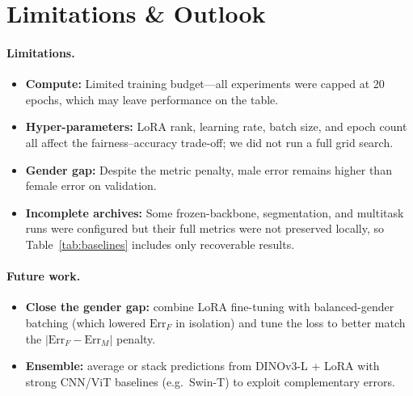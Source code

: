 \documentclass[10pt,a4paper]{article}
\begin{document}
\section*{Limitations \& Outlook}
\paragraph{Limitations.}
\begin{itemize}
  \item \textbf{Compute:} Limited training budget---all experiments were capped at 20 epochs, which may leave performance on the table.
  \item \textbf{Hyper-parameters:} LoRA rank, learning rate, batch size, and epoch count all affect the fairness--accuracy trade-off; we did not run a full grid search.
  \item \textbf{Gender gap:} Despite the metric penalty, male error remains higher than female error on validation.
  \item \textbf{Incomplete archives:} Some frozen-backbone, segmentation, and multitask runs were configured but their full metrics were not preserved locally, so Table~\ref{tab:baselines} includes only recoverable results.
\end{itemize}
\paragraph{Future work.}
\begin{itemize}
  \item \textbf{Close the gender gap:} combine LoRA fine-tuning with balanced-gender batching (which lowered $\mathrm{Err}_F$ in isolation) and tune the loss to better match the $|{\mathrm{Err}_F - \mathrm{Err}_M}|$ penalty.
  \item \textbf{Ensemble:} average or stack predictions from DINOv3-L + LoRA with strong CNN/ViT baselines (e.g.\ Swin-T) to exploit complementary errors.
\end{itemize}
\end{document}
